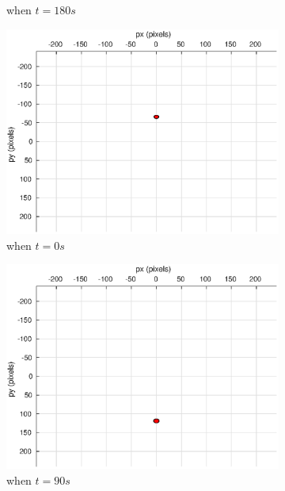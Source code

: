 \begin{figure}[htbp]
\begin{subfigure}[t]{0.32\linewidth}
		\caption{when $t=180s$}
	\end{subfigure}
	\begin{subfigure}[t]{0.32\linewidth}
		\includegraphics[width=\textwidth]{images/chapter4/image_camera_-5mps}
		\caption{when $t=0s$}
	\end{subfigure}
	\begin{subfigure}[t]{0.32\linewidth}
		\includegraphics[width=\textwidth]{images/chapter4/image_camera_-5mps_90s}
		\caption{when $t=90s$}
	\end{subfigure}
	\begin{subfigure}[t]{0.32\linewidth}

\end{subfigure}
\end{figure}
